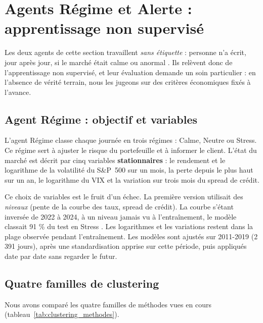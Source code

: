 \section{Agents Régime et Alerte : apprentissage non supervisé}
\label{sec:regime_alerte}

Les deux agents de cette section travaillent \emph{sans étiquette} : personne n'a écrit, jour après jour, si le marché était \og calme \fg{} ou \og anormal \fg{}. Ils relèvent donc de l'apprentissage non supervisé, et leur évaluation demande un soin particulier : en l'absence de vérité terrain, nous les jugeons sur des critères économiques fixés à l'avance.

\subsection{Agent Régime : objectif et variables}

L'agent Régime classe chaque journée en trois régimes : Calme, Neutre ou Stress. Ce régime sert à ajuster le risque du portefeuille et à informer le client. L'état du marché est décrit par cinq variables \textbf{stationnaires} : le rendement et le logarithme de la volatilité du S\&P~500 sur un mois, la perte depuis le plus haut sur un an, le logarithme du VIX et la variation sur trois mois du spread de crédit.

Ce choix de variables est le fruit d'un échec. La première version utilisait des \emph{niveaux} (pente de la courbe des taux, spread de crédit). La courbe s'étant inversée de 2022 à 2024, à un niveau jamais vu à l'entraînement, le modèle classait 91 \% du test en \og Stress \fg{}. Les logarithmes et les variations restent dans la plage observée pendant l'entraînement. Les modèles sont ajustés sur 2011-2019 (2\,391 jours), après une standardisation apprise sur cette période, puis appliqués date par date sans regarder le futur.

\subsection{Quatre familles de clustering}

Nous avons comparé les quatre familles de méthodes vues en cours (tableau~\ref{tab:clustering_methodes}).

